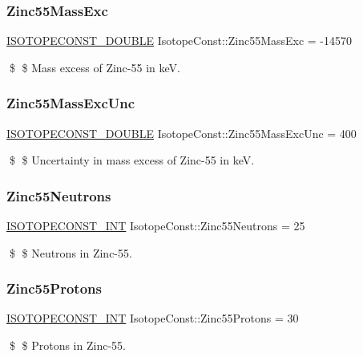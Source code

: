 \subsubsection{\texorpdfstring{Zinc55\+Mass\+Exc}{Zinc55MassExc}}
{\footnotesize\ttfamily \mbox{\hyperlink{group___isotope_const-_macros_ga8f45a7272ce02c0b4c65c44636ed719a}{I\+S\+O\+T\+O\+P\+E\+C\+O\+N\+S\+T\+\_\+\+D\+O\+U\+B\+LE}} Isotope\+Const\+::\+Zinc55\+Mass\+Exc = -\/14570}

\$ \$ Mass excess of Zinc-\/55 in keV. \mbox{\label{group___isotope_const-_zinc-_zn55_ga291ce991f1af11af6a2f5309ab93607d}} 
\subsubsection{\texorpdfstring{Zinc55\+Mass\+Exc\+Unc}{Zinc55MassExcUnc}}
{\footnotesize\ttfamily \mbox{\hyperlink{group___isotope_const-_macros_ga8f45a7272ce02c0b4c65c44636ed719a}{I\+S\+O\+T\+O\+P\+E\+C\+O\+N\+S\+T\+\_\+\+D\+O\+U\+B\+LE}} Isotope\+Const\+::\+Zinc55\+Mass\+Exc\+Unc = 400}

\$ \$ Uncertainty in mass excess of Zinc-\/55 in keV. \mbox{\label{group___isotope_const-_zinc-_zn55_ga7852fa4c1947a9ac31b11e5c758bce3f}} 
\subsubsection{\texorpdfstring{Zinc55\+Neutrons}{Zinc55Neutrons}}
{\footnotesize\ttfamily \mbox{\hyperlink{group___isotope_const-_macros_ga5f18360b3e99483a35c32d789e62621c}{I\+S\+O\+T\+O\+P\+E\+C\+O\+N\+S\+T\+\_\+\+I\+NT}} Isotope\+Const\+::\+Zinc55\+Neutrons = 25}

\$ \$ Neutrons in Zinc-\/55. \mbox{\label{group___isotope_const-_zinc-_zn55_ga2fa2054c7ecfa0469b2668d7861dbdec}} 
\subsubsection{\texorpdfstring{Zinc55\+Protons}{Zinc55Protons}}
{\footnotesize\ttfamily \mbox{\hyperlink{group___isotope_const-_macros_ga5f18360b3e99483a35c32d789e62621c}{I\+S\+O\+T\+O\+P\+E\+C\+O\+N\+S\+T\+\_\+\+I\+NT}} Isotope\+Const\+::\+Zinc55\+Protons = 30}

\$ \$ Protons in Zinc-\/55. 